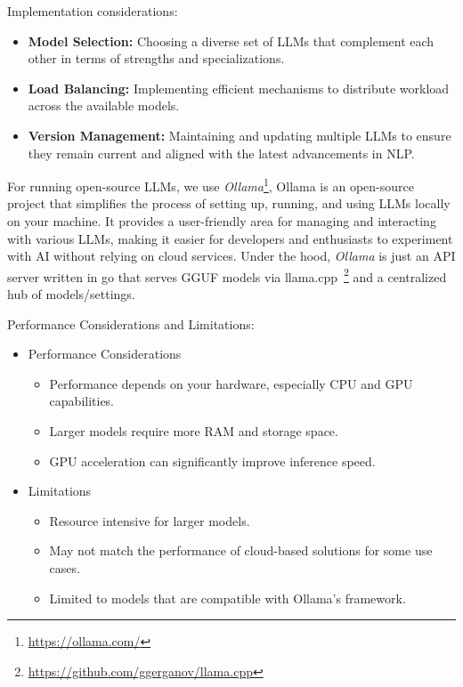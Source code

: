 Implementation considerations:
\begin{itemize}
    \item \textbf{Model Selection:} Choosing a diverse set of LLMs that complement each other in terms of strengths and specializations.
    \item \textbf{Load Balancing:} Implementing efficient mechanisms to distribute workload across the available models.
    \item \textbf{Version Management:} Maintaining and updating multiple LLMs to ensure they remain current and aligned with the latest advancements in NLP.
\end{itemize}

For running open-source LLMs, we use \textit{Ollama}\footnote{\url{https://ollama.com/}}, Ollama is an open-source project that simplifies the process of setting up, running, and using LLMs locally on your machine.
It provides a user-friendly area for managing and interacting with various LLMs, making it easier for developers and enthusiasts to experiment with AI without relying on cloud services.
Under the hood, \textit{Ollama} is just an API server written in go that serves GGUF models via llama.cpp~\footnote{\url{https://github.com/ggerganov/llama.cpp}} and a centralized hub of models/settings.

Performance Considerations and Limitations:
\begin{itemize}
    \item Performance Considerations
    \begin{itemize}
        \item Performance depends on your hardware, especially CPU and GPU capabilities.
        \item Larger models require more RAM and storage space.
        \item GPU acceleration can significantly improve inference speed.
    \end{itemize}
    \item Limitations
    \begin{itemize}
        \item Resource intensive for larger models.
        \item May not match the performance of cloud-based solutions for some use cases.
        \item Limited to models that are compatible with Ollama's framework.
    \end{itemize}
\end{itemize}

